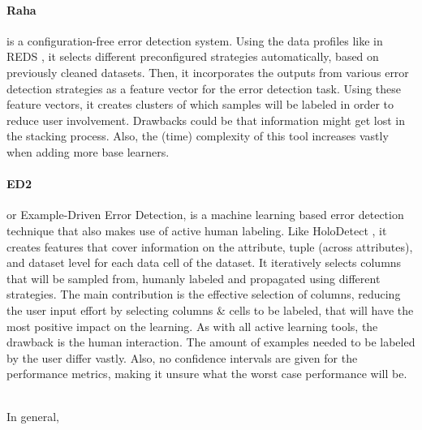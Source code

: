 \paragraph{Raha \cite{Mahdavi2019-zf}} is a configuration-free error detection system. Using the data profiles like in REDS \cite{Mahdavi2019-pk}, it selects different preconfigured strategies automatically, based on previously cleaned datasets. Then, it incorporates the outputs from various error detection strategies as a feature vector for the error detection task. 
Using these feature vectors, it creates clusters of which samples will be labeled in order to reduce user involvement. Drawbacks could be that information might get lost in the stacking process. Also, the (time) complexity of this tool increases vastly when adding more base learners.

\paragraph{ED2 \cite{Neutatz2019-aw}} or Example-Driven Error Detection, is a machine learning based error detection technique that also makes use of active human labeling. 
Like HoloDetect \cite{Heidari2019-ox}, it creates features that cover information on the attribute, tuple (across attributes), and dataset level for each data cell of the dataset. It iteratively selects columns that will be sampled from, humanly labeled and propagated using different strategies. The main contribution is the effective selection of columns, reducing the user input effort by selecting columns \& cells to be labeled, that will have the most positive impact on the learning. As with all active learning tools, the drawback is the human interaction. The amount of examples needed to be labeled by the user differ vastly. Also, no confidence intervals are given for the performance metrics, making it unsure what the worst case performance will be. 

~\\In general, 


